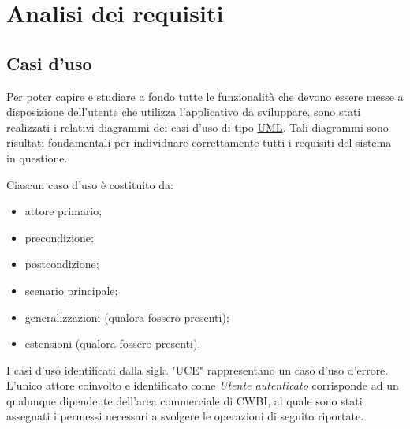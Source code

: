 \chapter{Analisi dei requisiti}
\label{cap:analisi-requisiti}


\setlength{\parskip}{3ex}

\section{Casi d'uso}
Per poter capire e studiare a fondo tutte le funzionalità che devono essere messe a disposizione dell'utente che utilizza l'applicativo da sviluppare, sono stati realizzati i relativi diagrammi dei casi d'uso di tipo {\hyperref[para:uml-definition]{UML}}\glsfirstoccur. Tali diagrammi sono risultati fondamentali per individuare correttamente tutti i requisiti del sistema in questione.

\setlength{\parskip}{3ex}

\noindent Ciascun caso d'uso è costituito da:
\begin{itemize}
\item attore primario;
\item precondizione;
\item postcondizione;
\item scenario principale;
\item generalizzazioni (qualora fossero presenti);
\item estensioni (qualora fossero presenti).
\end{itemize}

\setlength{\parskip}{3ex}

\noindent I casi d'uso identificati dalla sigla "UCE" rappresentano un caso d'uso d'errore.
L'unico attore coinvolto e identificato come \textit{Utente autenticato} corrisponde ad un qualunque dipendente dell'area commerciale di CWBI, al quale sono stati assegnati i permessi necessari a svolgere le operazioni di seguito riportate.  

\pagebreak


